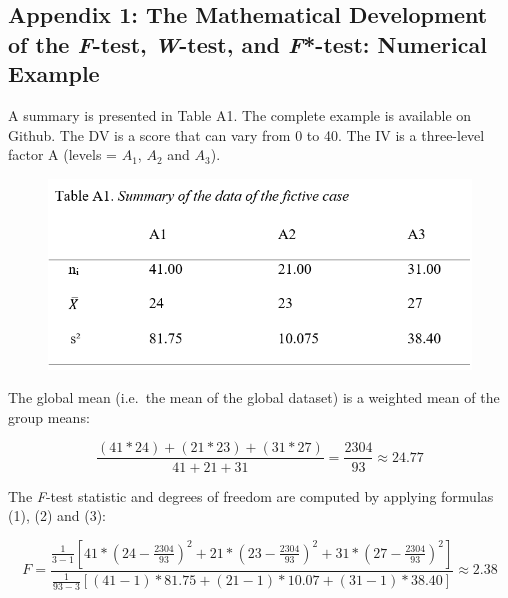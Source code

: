 \clearpage
\makeatletter
\efloat@restorefloats
\makeatother


\begin{appendix}
\section{}
\setlength{\parindent}{0.0in}
\setlength{\leftskip}{0.0in}

\hypertarget{appendix-1-the-mathematical-development-of-the-f-test-w-test-and-f-test-numerical-example}{%
\subsection{\texorpdfstring{Appendix 1: The Mathematical Development of
the \emph{F}-test, \emph{W}-test, and \emph{F}*-test: Numerical
Example}{Appendix 1: The Mathematical Development of the F-test, W-test, and F*-test: Numerical Example}}\label{appendix-1-the-mathematical-development-of-the-f-test-w-test-and-f-test-numerical-example}}

A summary is presented in Table A1. The complete example is available on
Github. The DV is a score that can vary from 0 to 40. The IV is a
three-level factor A (levels = \(A_1\), \(A_2\) and \(A_3\)).

\begin{figure}
\includegraphics[width=1\linewidth]{Rmarkdown folder/Rmarkdown inputs/TableA1} \end{figure}

The global mean (i.e.~the mean of the global dataset) is a weighted mean
of the group means:

\[\frac{(41*24)+(21*23)+(31*27)}{41+21+31}=\frac{2304}{93} \approx 24.77\]

The \emph{F}-test statistic and degrees of freedom are computed by
applying formulas (1), (2) and (3):

\[
F=\frac{\frac{1}{3-1}[41*(24-\frac{2304}{93})^2+21*(23-\frac{2304}{93})^2+31*(27-\frac{2304}{93})^2]}
{\frac{1}{93-3}[(41-1)*81.75+(21-1)*10.07+(31-1)*38.40]} \approx 2.38
\]


\end{appendix}
